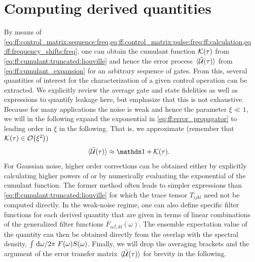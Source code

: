 \section{Computing derived quantities}\label{sec:ff:theory:derived_quantities}
By means of \cref{eq:ff:control_matrix:sequence:freq,eq:ff:control_matrix:pulse:freq:ff:calculation,eq:ff:frequency_shifts:freq}, one can obtain the cumulant function $\mathcal{K}(\tau)$ from \cref{eq:ff:cumulant:truncated:liouville} and hence the error process $\expval*{\mathcal{\tilde{U}}(\tau)}$ from \cref{eq:ff:cumulant_expansion} for an arbitrary sequence of gates.
From this, several quantities of interest for the characterization of a given control operation can be extracted.
We explicitly review the average gate and state fidelities as well as expressions to quantify leakage here, but emphasize that this is not exhaustive.
Because for many applications the noise is weak and hence the parameter $\xi\ll 1$, we will in the following expand the exponential in \cref{eq:ff:error_propagator} to leading order in $\xi$ in the following.
That is, we approximate (remember that $\cumulantfun(\tau)\in\order{\xi^2})$
\begin{equation}\label{eq:ff:error_transfer_matrix:approx}
\ev*{\liouvUe(\tau)}\approx\eye + \cumulantfun(\tau).
\end{equation}
For Gaussian noise, higher order corrections can be obtained either by explicitly calculating higher powers of \cumulantfun or by numerically evaluating the exponential of the cumulant function.
The former method often leads to simpler expressions than \cref{eq:ff:cumulant:truncated:liouville} for which the trace tensor $T_{ijkl}$ need not be computed directly.
In the weak-noise regime, one can also define specific filter functions for each derived quantity that are given in terms of linear combinations of the generalized filter functions $F_{\alpha\beta,kl}(\omega)$.
The ensemble expectation value of the quantity can then be obtained directly from the overlap with the spectral density, $\int\flatfrac{\dd{\omega}}{2\pi} F(\omega) S(\omega)$.
Finally, we will drop the averaging brackets and the argument of the error transfer matrix $\ev*{\liouvUe(\tau)}$ for brevity in the following.

